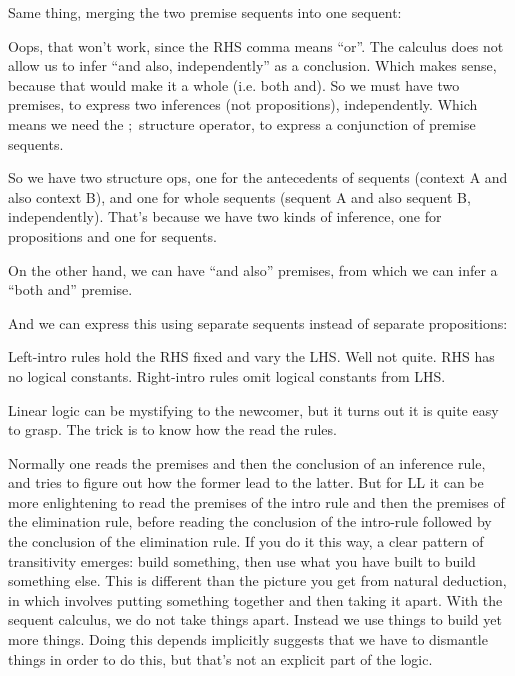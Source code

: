 \documentclass{article}
\begin{document}
Same thing, merging the two premise sequents into one sequent:


Oops, that won't work, since the RHS comma means ``or''. The calculus
does not allow us to infer ``and also, independently'' as a conclusion.
Which makes sense, because that would make it a whole (i.e. both and).
So we must have two premises, to express two inferences (not
propositions), independently. Which means we need the $;$ structure
operator, to express a conjunction of premise sequents.

So we have two structure ops, one for the antecedents of sequents
(context A and also context B), and one for whole sequents (sequent A
and also sequent B, independently). That's because we have two kinds of
inference, one for propositions and one for sequents.

On the other hand, we can have ``and also'' premises, from which we
can infer a ``both and'' premise.


And we can express this using separate sequents instead of separate
propositions:


Left-intro rules hold the RHS fixed and vary the LHS. Well not quite. RHS has no logical constants.  Right-intro rules omit logical constants from LHS.

Linear logic can be mystifying to the newcomer, but it turns out it is
quite easy to grasp. The trick is to know how the read the rules.

Normally one reads the premises and then the conclusion of an
inference rule, and tries to figure out how the former lead to the
latter. But for LL it can be more enlightening to read the premises of
the intro rule and then the premises of the elimination rule, before
reading the conclusion of the intro-rule followed by the conclusion of
the elimination rule. If you do it this way, a clear pattern of
transitivity emerges: build something, then use what you have built to
build something else. This is different than the picture you get from
natural deduction, in which involves putting something together and
then taking it apart. With the sequent calculus, we do not take things
apart. Instead we use things to build yet more things. Doing this
depends implicitly suggests that we have to dismantle things in order
to do this, but that's not an explicit part of the logic.
\end{document}
